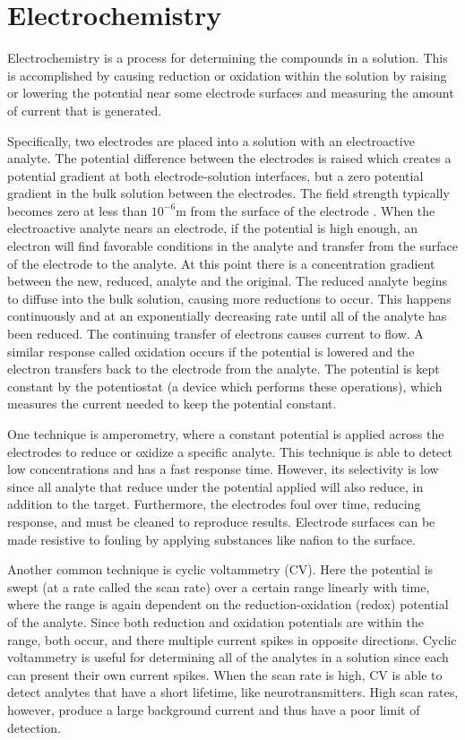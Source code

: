 \documentclass{report}
\begin{document}
\chapter{Electrochemistry}

Electrochemistry is a process for determining the compounds in a solution. This is accomplished by causing reduction or oxidation within the solution by raising or lowering the potential near some electrode surfaces and measuring the amount of current that is generated.

Specifically, two electrodes are placed into a solution with an electroactive analyte. The potential difference between the electrodes is raised which creates a potential gradient at both electrode-solution interfaces, but a zero potential gradient in the bulk solution between the electrodes. The field strength typically becomes zero at less than $10^{-6}\mathrm{m}$ from the surface of the electrode \cite{kissinger}. When the electroactive analyte nears an electrode, if the potential is high enough, an electron will find favorable conditions in the analyte and transfer from the surface of the electrode to the analyte. At this point there is a concentration gradient between the new, reduced, analyte and the original. The reduced analyte begins to diffuse into the bulk solution, causing more reductions to occur. This happens continuously and at an exponentially decreasing rate until all of the analyte has been reduced. The continuing transfer of electrons causes current to flow. A similar response called oxidation occurs if the potential is lowered and the electron transfers back to the electrode from the analyte. The potential is kept constant by the potentiostat (a device which performs these operations), which measures the current needed to keep the potential constant.

One technique is amperometry, where a constant potential is applied across the electrodes to reduce or oxidize a specific analyte. This technique is able to detect low concentrations and has a fast response time. However, its selectivity is low since all analyte that reduce under the potential applied will also reduce, in addition to the target. Furthermore, the electrodes foul over time, reducing response, and must be cleaned to reproduce results. Electrode surfaces can be made resistive to fouling by applying substances like nafion to the surface.

Another common technique is cyclic voltammetry (CV). Here the potential is swept (at a rate called the scan rate) over a certain range linearly with time, where the range is again dependent on the reduction-oxidation (redox) potential of the analyte. Since both reduction and oxidation potentials are within the range, both occur, and there multiple current spikes in opposite directions. Cyclic voltammetry is useful for determining all of the analytes in a solution since each can present their own current spikes. When the scan rate is high, CV is able to detect analytes that have a short lifetime, like neurotransmitters. High scan rates, however, produce a large background current and thus have a poor limit of detection.
\end{document}
